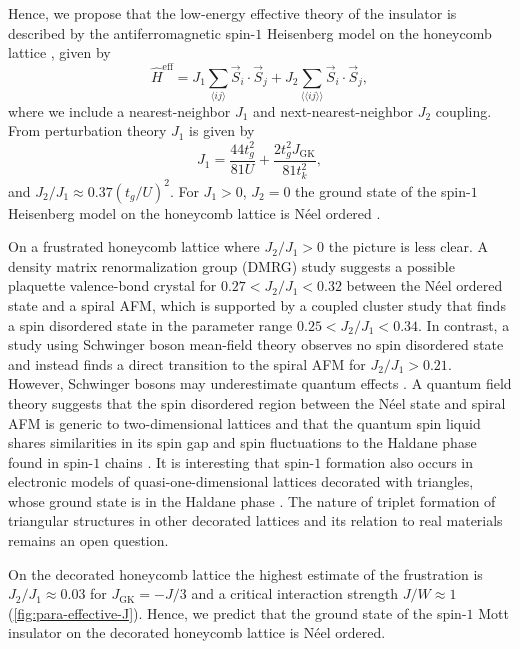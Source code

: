 \documentclass[reprint,aps,prb,amsmath,amssymb]{revtex4-2}
\begin{document}
Hence, we propose that the low-energy effective theory of the insulator is described by the antiferromagnetic spin-$1$ Heisenberg model on the honeycomb lattice \cite{Merino2016,Powell2017,Merino2017}, given by
%
\begin{equation} \label{eq:heis}
\hat{H}^{\mathrm{eff}} = J_1 \sum_{\langle ij \rangle} \vec{S}_i \cdot \vec{S}_j + J_2 \sum_{\langle \langle ij \rangle \rangle} \vec{S}_i \cdot \vec{S}_j,
\end{equation}
%
where we include a nearest-neighbor $J_1$ and next-nearest-neighbor $J_2$ coupling. From perturbation theory $J_1$ is given by \cite{Merino2016}
%
\begin{equation}
	J_1 = \frac{44 t_g^2}{81 U} + \frac{2 t_g^2 J_{\mathrm{GK}}}{81 t_k^2},
\end{equation}
%
and $J_2 / J_1 \approx 0.37 (t_g/U)^2$.
%
For $J_1 > 0$, $J_2 = 0$ the ground state of the spin-$1$ Heisenberg model on the honeycomb lattice is N\'eel ordered \cite{Gong2015,Li2016,Merino2018,Merino2018b}.

On a frustrated honeycomb lattice where $J_2/J_1 > 0$ the picture is less clear. A density matrix renormalization group (DMRG) study \cite{Gong2015} suggests a possible plaquette valence-bond crystal for $0.27 < J_2/J_1 < 0.32$ between the N\'eel ordered state and a spiral AFM, which is supported by a coupled cluster study \cite{Li2016} that finds a spin disordered state in the parameter range $0.25 < J_2/J_1 < 0.34$. In contrast, a study using Schwinger boson mean-field theory \cite{Merino2018b} observes no spin disordered state and instead finds a direct transition to the spiral AFM for $J_2/J_1 > 0.21$. However, Schwinger bosons may underestimate quantum effects \cite{Bauer2017,Merino2018b}. A quantum field theory suggests that the spin disordered region between the N\'eel state and spiral AFM is generic to two-dimensional lattices and that the quantum spin liquid shares similarities in its spin gap and spin fluctuations to the Haldane phase found in spin-$1$ chains \cite{Kharkov2018}. It is interesting that spin-$1$ formation also occurs in electronic models of quasi-one-dimensional lattices decorated with triangles, whose ground state is in the Haldane phase \cite{Janani2014a,Janani2014b,Nourse2016,Reja2019}. The nature of triplet formation of triangular structures in other decorated lattices and its relation to real materials remains an open question.

On the decorated honeycomb lattice the highest estimate of the frustration is $J_2 / J_1 \approx 0.03$ for $J_{\mathrm{GK}} = -J/3$ and a critical interaction strength $J / W \approx 1$ (\cref{fig:para-effective-J}). Hence, we predict that the ground state of the spin-$1$ Mott insulator on the decorated honeycomb lattice is N\'{e}el ordered.
\end{document}
